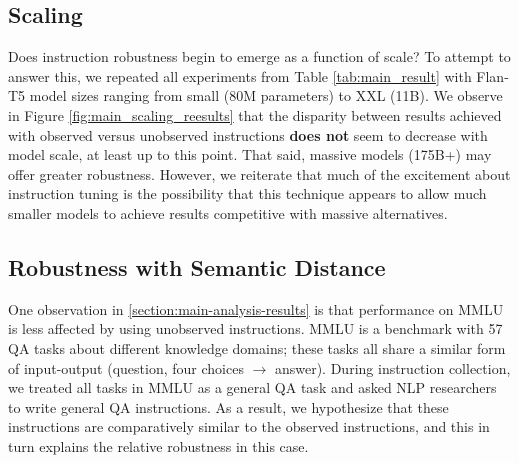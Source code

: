\subsection{Scaling}

Does instruction robustness begin to emerge as a function of scale?
To attempt to answer this, we repeated all experiments from Table \ref{tab:main_result} with Flan-T5 model sizes ranging from small (80M parameters) to XXL (11B).
We observe in Figure \ref{fig:main_scaling_reesults} that the disparity between results achieved with observed versus unobserved instructions \textbf{does not} seem to decrease with model scale, at least up to this point.
That said, massive models (175B+) may offer greater robustness.
However, we reiterate that much of the excitement about instruction tuning is the possibility that this technique appears to allow much smaller models to achieve results competitive with massive alternatives.


\subsection{Robustness with Semantic Distance}
\label{section:mmlu_variance}

One observation in \ref{section:main-analysis-results} is that performance on \textsc{MMLU} is less affected by using unobserved instructions.
\textsc{MMLU} is a benchmark with 57 QA tasks about different knowledge domains; these tasks all share a similar form of input-output (question, four choices $\rightarrow$ answer).
During instruction collection, we treated all tasks in \textsc{MMLU} as a general QA task and asked NLP researchers to write general QA instructions.
As a result, we hypothesize that these instructions are comparatively similar to the observed instructions, and this in turn explains the relative robustness in this case.

